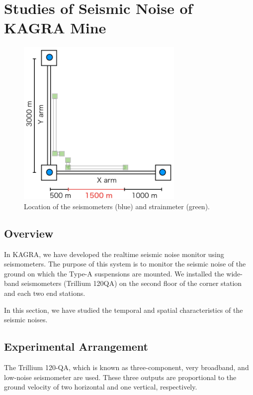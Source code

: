 \section{Studies of Seismic Noise of KAGRA Mine} \label{sec:33}
\begin{figure}[h]
  \begin{center}   
    \includegraphics[width=8cm]{./img_chap3/img328a.png}
    \caption{Location of the seismometers (blue) and strainmeter (green).}\label{img:img328a}
  \end{center}
\end{figure}

\subsection{Overview}
In KAGRA, we have developed the realtime seismic noise monitor using seismometers. The purpose of this system is to monitor the seismic noise of the ground on which the Type-A suspensions are mounted. We installed the wide-band seismometers (Trillium 120QA) on the second floor of the corner station and each two end stations. 

In this section, we have studied the temporal and spatial characteristics of the seismic noises.

\subsection{Experimental Arrangement}\label{sec:331}
The Trillium 120-QA, which is known as three-component, very broadband, and low-noise seismometer are used. These three outputs are proportional to the ground velocity of two horizontal and one vertical, respectively. 

